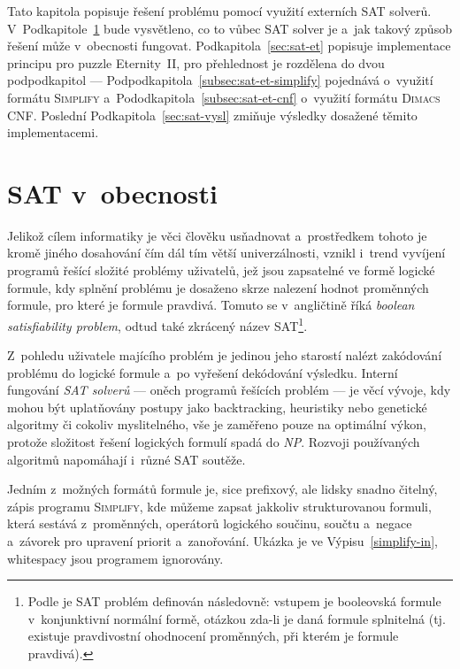 \documentclass[11pt, titlepage]{report}
\begin{document}
Tato kapitola popisuje řešení problému pomocí využití externích SAT solverů. V~Podkapitole~\ref{sec:sat-obecne} bude vysvětleno, co to vůbec SAT solver je a~jak takový způsob řešení může v~obecnosti fungovat. Podkapitola~\ref{sec:sat-et} popisuje implementace principu pro puzzle Eternity~II, pro přehlednost je rozdělena do dvou podpodkapitol --- Podpodkapitola~\ref{subsec:sat-et-simplify} pojednává o~využití formátu \textsc{Simplify} a~Pododkapitola~\ref{subsec:sat-et-cnf} o~využití formátu \textsc{Dimacs CNF}. Poslední Podkapitola~\ref{sec:sat-vysl} zmiňuje výsledky dosažené těmito implementacemi.

\section{SAT v~obecnosti}
\label{sec:sat-obecne}

Jelikož cílem informatiky je věci člověku usňadnovat a~prostředkem tohoto je kromě jiného dosahování čím dál tím větší univerzálnosti, vznikl i~trend vyvíjení programů řešící složité problémy uživatelů, jež jsou zapsatelné ve formě logické formule, kdy splnění problému je dosaženo skrze nalezení hodnot proměnných formule, pro které je formule pravdivá. Tomuto se v~angličtině říká \emph{boolean satisfiability problem}, odtud také zkrácený název SAT\footnote{Podle \cite[str. 182]{np-skripta} je SAT problém definován následovně: vstupem je booleovská formule v~konjunktivní normální formě, otázkou zda-li je daná formule splnitelná (tj. existuje pravdivostní ohodnocení proměnných, při kterém je formule pravdivá).}.

Z~pohledu uživatele majícího problém je jedinou jeho starostí nalézt zakódování problému do logické formule a~po vyřešení dekódování výsledku. Interní fungování \emph{SAT solverů} --- oněch programů řešících problém --- je věcí vývoje, kdy mohou být uplatňovány postupy jako backtracking, heuristiky nebo genetické algoritmy či cokoliv myslitelného, vše je zaměřeno pouze na optimální výkon, protože složitost řešení logických formulí spadá do \emph{NP}. Rozvoji používaných algoritmů napomáhají i~různé SAT soutěže.

Jedním z~možných formátů formule je, sice prefixový, ale lidsky snadno čitelný, zápis programu \textsc{Simplify}, kde můžeme zapsat jakkoliv strukturovanou formuli, která sestává z~proměnných, operátorů logického součinu, součtu a~negace a~závorek pro upravení priorit a~zanořování. Ukázka je ve Výpisu~\ref{simplify-in}, whitespacy jsou programem ignorovány.
\end{document}
